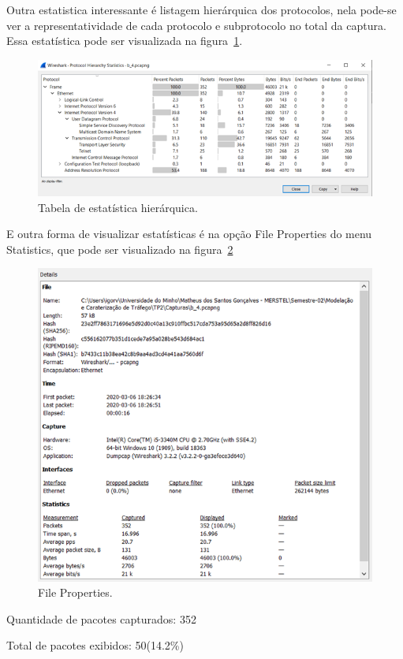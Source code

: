\documentclass{llncs}
\begin{document}
\begin{flushleft}
  \par Outra estatistica interessante é listagem hierárquica dos protocolos, nela pode-se ver a representatividade de cada protocolo e subprotocolo no total da captura. Essa estatística pode ser visualizada na figura~\ref{fig:statistic}.
  \begin{figure}[h]
    \includegraphics[scale=0.65]{statistic.png}
    \centering
    \caption{Tabela de estatística hierárquica.}
    \label{fig:statistic}
  \end{figure}
\end{flushleft}

\begin{flushleft}
  \par E outra forma de visualizar estatísticas é na opção File Properties do menu Statistics, que pode ser visualizado na figura~\ref{fig:details}
  \begin{figure}[h]
    \includegraphics[scale=0.65]{details.png}
    \centering
    \caption{File Properties.}
    \label{fig:details}
  \end{figure}
  \par Quantidade de pacotes capturados: 352
  \par Total de pacotes exibidos: 50(14.2\%)
  
\end{flushleft}
\end{document}
